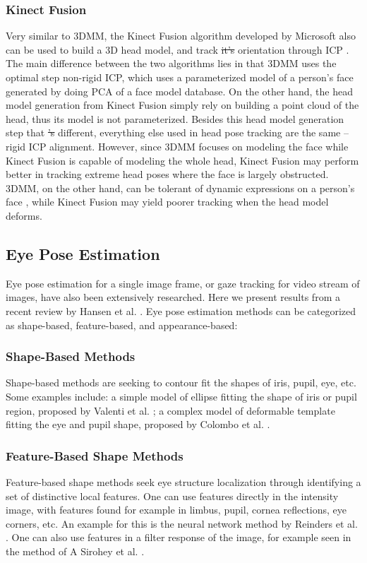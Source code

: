 \documentclass{ut-thesis}
\providecommand{\DIFaddtex}[1]{{\protect\color{blue}\uwave{#1}}} %
\providecommand{\DIFdeltex}[1]{{\protect\color{red}\sout{#1}}}                      %
\providecommand{\DIFaddbegin}{} %
\providecommand{\DIFaddend}{} %
\providecommand{\DIFdelbegin}{} %
\providecommand{\DIFdelend}{} %
\providecommand{\DIFadd}[1]{\texorpdfstring{\DIFaddtex{#1}}{#1}} %
\providecommand{\DIFdel}[1]{\texorpdfstring{\DIFdeltex{#1}}{}} %
\begin{document}
\subsubsection{Kinect Fusion}
Very similar to 3DMM, the Kinect Fusion algorithm developed by Microsoft also can be used to build a 3D head model, and track \DIFdelbegin \DIFdel{it's }\DIFdelend \DIFaddbegin \DIFadd{its }\DIFaddend orientation through ICP \cite{newcombe2011kinectfusion}.  The main difference between the two algorithms lies in that 3DMM uses the optimal step non-rigid ICP, which uses a parameterized model of a person's face generated by doing PCA of a face model database.  On the other hand, the head model generation from Kinect Fusion simply rely on building a point cloud of the head, thus its model is not parameterized.  Besides this head model generation step that \DIFdelbegin \DIFdel{'s }\DIFdelend \DIFaddbegin \DIFadd{is }\DIFaddend different, everything else used in head pose tracking are the same -- rigid ICP alignment.  However, since 3DMM focuses on modeling the face while Kinect Fusion is capable of modeling the whole head, Kinect Fusion may perform better in tracking extreme head poses where the face is largely obstructed.  3DMM, on the other hand, can be tolerant of dynamic expressions on a person's face \cite{amberg2008expression}, while Kinect Fusion may yield poorer tracking when the head model deforms.

\subsection{Eye Pose Estimation}
Eye pose estimation for a single image frame, or gaze tracking for video stream of images, have also been extensively researched.  Here we present results from a recent review by Hansen et al. \cite{hansen2010eye}.  Eye pose estimation methods can be categorized as shape-based, feature-based, and appearance-based:


\subsubsection{Shape-Based Methods}
Shape-based methods are seeking to contour fit the shapes of iris, pupil, eye, etc.  Some examples include: a simple model of ellipse fitting the shape of iris or pupil region, proposed by Valenti et al. \cite{valenti2008accurate}; a complex model of deformable template fitting the eye and pupil shape, proposed by Colombo et al. \cite{colombo1999real}.


\subsubsection{Feature-Based Shape Methods}
Feature-based shape methods seek eye structure localization through identifying a set of distinctive local features.  One can use features directly in the intensity image, with features found for example in limbus, pupil, cornea reflections, eye corners, etc.  An example for this is the neural network method by Reinders et al. \cite{reinders1996locating}.  One can also use features in a filter response of the image, for example seen in the method of A Sirohey et al. \cite{sirohey2001eye}.
\end{document}

